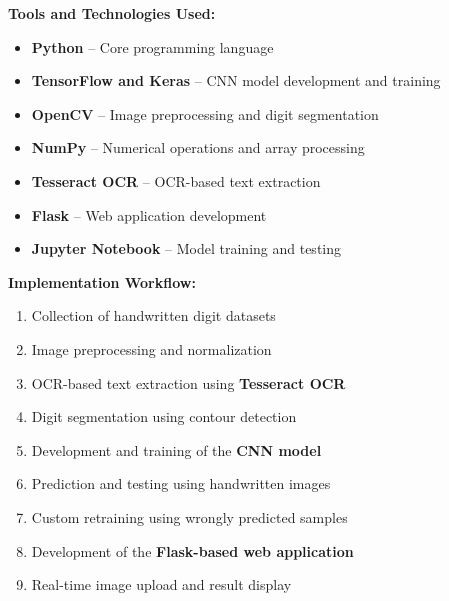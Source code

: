 \documentclass[12pt,a4paper]{article}
\begin{document}
\noindent
\textbf{Tools and Technologies Used:}

\begin{itemize}

\item \textbf{Python} -- Core programming language

\item \textbf{TensorFlow and Keras} -- CNN model development and training

\item \textbf{OpenCV} -- Image preprocessing and digit segmentation

\item \textbf{NumPy} -- Numerical operations and array processing

\item \textbf{Tesseract OCR} -- OCR-based text extraction

\item \textbf{Flask} -- Web application development

\item \textbf{Jupyter Notebook} -- Model training and testing

\end{itemize}

\vspace{0.4cm}

\noindent
\textbf{Implementation Workflow:}

\begin{enumerate}

\item Collection of handwritten digit datasets

\item Image preprocessing and normalization

\item OCR-based text extraction using \textbf{Tesseract OCR}

\item Digit segmentation using contour detection

\item Development and training of the \textbf{CNN model}

\item Prediction and testing using handwritten images

\item Custom retraining using wrongly predicted samples

\item Development of the \textbf{Flask-based web application}

\item Real-time image upload and result display

\end{enumerate}
\end{document}
